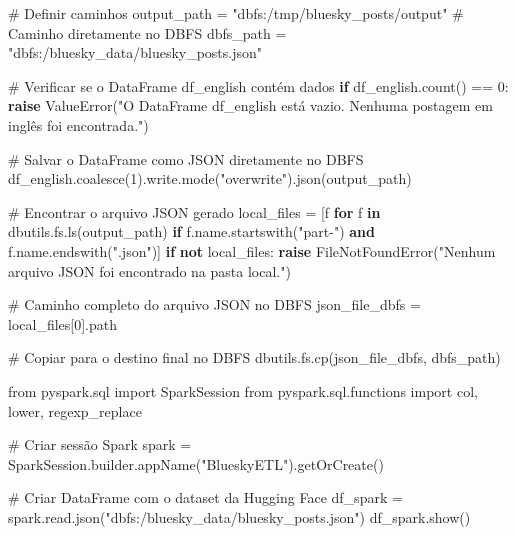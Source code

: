 \documentclass[
  letterpaper,
  DIV=11,
  numbers=noendperiod]{scrartcl}
\newenvironment{Shaded}{\begin{snugshade}}{\end{snugshade}}
\newcommand{\CommentTok}[1]{\textcolor[rgb]{0.37,0.37,0.37}{#1}}
\newcommand{\ControlFlowTok}[1]{\textcolor[rgb]{0.00,0.23,0.31}{\textbf{#1}}}
\newcommand{\DecValTok}[1]{\textcolor[rgb]{0.68,0.00,0.00}{#1}}
\newcommand{\ImportTok}[1]{\textcolor[rgb]{0.00,0.46,0.62}{#1}}
\newcommand{\KeywordTok}[1]{\textcolor[rgb]{0.00,0.23,0.31}{\textbf{#1}}}
\newcommand{\NormalTok}[1]{\textcolor[rgb]{0.00,0.23,0.31}{#1}}
\newcommand{\OperatorTok}[1]{\textcolor[rgb]{0.37,0.37,0.37}{#1}}
\newcommand{\PreprocessorTok}[1]{\textcolor[rgb]{0.68,0.00,0.00}{#1}}
\newcommand{\StringTok}[1]{\textcolor[rgb]{0.13,0.47,0.30}{#1}}
\begin{document}
\begin{Shaded}
\begin{Highlighting}[]
\CommentTok{\# Definir caminhos}
\NormalTok{output\_path }\OperatorTok{=} \StringTok{"dbfs:/tmp/bluesky\_posts/output"}  \CommentTok{\# Caminho diretamente no DBFS}
\NormalTok{dbfs\_path }\OperatorTok{=} \StringTok{"dbfs:/bluesky\_data/bluesky\_posts.json"}

\CommentTok{\# Verificar se o DataFrame df\_english contém dados}
\ControlFlowTok{if}\NormalTok{ df\_english.count() }\OperatorTok{==} \DecValTok{0}\NormalTok{:}
    \ControlFlowTok{raise} \PreprocessorTok{ValueError}\NormalTok{(}\StringTok{"O DataFrame df\_english está vazio. Nenhuma postagem em inglês foi encontrada."}\NormalTok{)}

\CommentTok{\# Salvar o DataFrame como JSON diretamente no DBFS}
\NormalTok{df\_english.coalesce(}\DecValTok{1}\NormalTok{).write.mode(}\StringTok{"overwrite"}\NormalTok{).json(output\_path)}

\CommentTok{\# Encontrar o arquivo JSON gerado}
\NormalTok{local\_files }\OperatorTok{=}\NormalTok{ [f }\ControlFlowTok{for}\NormalTok{ f }\KeywordTok{in}\NormalTok{ dbutils.fs.ls(output\_path) }\ControlFlowTok{if}\NormalTok{ f.name.startswith(}\StringTok{"part{-}"}\NormalTok{) }\KeywordTok{and}\NormalTok{ f.name.endswith(}\StringTok{".json"}\NormalTok{)]}
\ControlFlowTok{if} \KeywordTok{not}\NormalTok{ local\_files:}
    \ControlFlowTok{raise} \PreprocessorTok{FileNotFoundError}\NormalTok{(}\StringTok{"Nenhum arquivo JSON foi encontrado na pasta local."}\NormalTok{)}

\CommentTok{\# Caminho completo do arquivo JSON no DBFS}
\NormalTok{json\_file\_dbfs }\OperatorTok{=}\NormalTok{ local\_files[}\DecValTok{0}\NormalTok{].path}

\CommentTok{\# Copiar para o destino final no DBFS}
\NormalTok{dbutils.fs.cp(json\_file\_dbfs, dbfs\_path)}
\end{Highlighting}
\end{Shaded}

\begin{Shaded}
\begin{Highlighting}[]
\ImportTok{from}\NormalTok{ pyspark.sql }\ImportTok{import}\NormalTok{ SparkSession}
\ImportTok{from}\NormalTok{ pyspark.sql.functions }\ImportTok{import}\NormalTok{ col, lower, regexp\_replace}

\CommentTok{\# Criar sessão Spark}
\NormalTok{spark }\OperatorTok{=}\NormalTok{ SparkSession.builder.appName(}\StringTok{"BlueskyETL"}\NormalTok{).getOrCreate()}

\CommentTok{\# Criar DataFrame com o dataset da Hugging Face}
\NormalTok{df\_spark }\OperatorTok{=}\NormalTok{ spark.read.json(}\StringTok{"dbfs:/bluesky\_data/bluesky\_posts.json"}\NormalTok{)}
\NormalTok{df\_spark.show()}
\end{Highlighting}
\end{Shaded}
\end{document}
